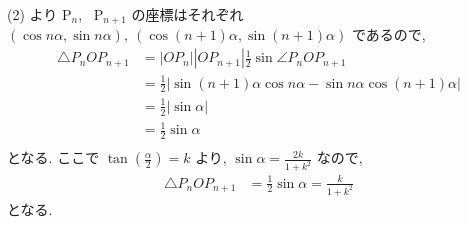 \documentclass[a4j, 11pt]{jarticle}
\begin{document}
%
%






%
%







%
%






%
%

 (2) より P$_n$, \ P$_{n + 1}$ の座標はそれぞれ $(\cos n \alpha, \sin n \alpha), \ (\cos (n + 1) \alpha, \sin (n + 1) \alpha)$ であるので,
  \begin{align*}
   \triangle P_n O P_{n + 1} &= |O P_n| |O P_{n + 1}| \frac{1}{2} \sin \angle P_n O P_{n + 1} \\
                                   &= \frac{1}{2} \left| \sin (n + 1) \alpha \cos n \alpha - \sin n \alpha \cos (n + 1) \alpha \right| \\
                                   &= \frac{1}{2} \left| \sin \alpha \right| \\
                                   &= \frac{1}{2} \sin \alpha \\
  \end{align*}
 となる. ここで $\tan \left( \frac{\alpha}{2} \right) = k$ より, $\sin \alpha = \displaystyle \frac{2k}{1 + k^2}$ なので, 
  \begin{align*}
   \triangle P_n O P_{n + 1} &= \frac{1}{2} \sin \alpha = \frac{k}{1 + k^2}
  \end{align*}
 となる.

%
%





%
%






%
%
\end{document}
